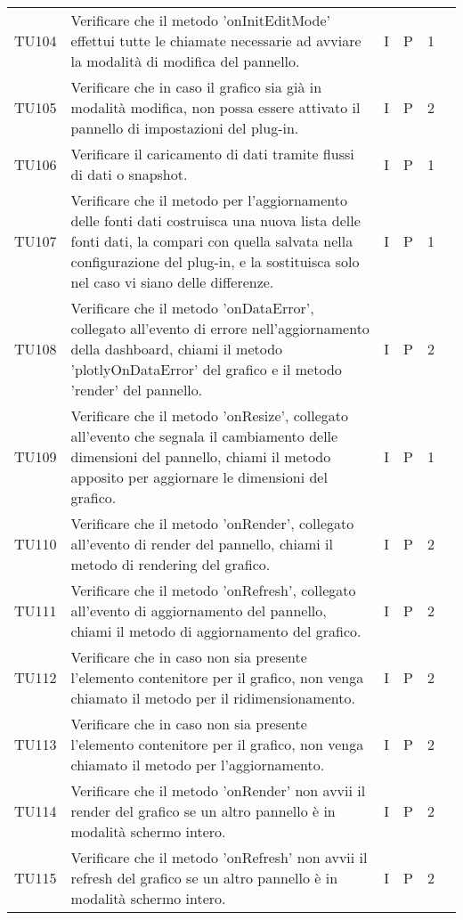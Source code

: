 \begin{longtable} {
		>{}p{12mm}
		>{}p{79.5mm}
		>{}p{9mm}
		>{}p{8mm}
		>{}p{14mm}
		>{}p{0mm}}
	TU104		& Verificare che il metodo 'onInitEditMode' effettui tutte le chiamate necessarie ad avviare la modalità di modifica del pannello. & I & P & 1 & \TBstrut \\ [2mm]
	TU105		& Verificare che in caso il grafico sia già in modalità modifica, non possa essere attivato il pannello di impostazioni del plug-in. & I & P & 2 & \TBstrut \\ [2mm]
	TU106		& Verificare il caricamento di dati tramite flussi di dati o snapshot. & I & P & 1 & \TBstrut \\ [2mm]
	TU107		& Verificare che il metodo per l'aggiornamento delle fonti dati costruisca una nuova lista delle fonti dati, la compari con quella salvata nella configurazione del plug-in, e la sostituisca solo nel caso vi siano delle differenze. & I & P & 1 & \TBstrut \\ [2mm]
	TU108		& Verificare che il metodo 'onDataError', collegato all'evento di errore nell'aggiornamento della dashboard, chiami il metodo 'plotlyOnDataError' del grafico e il metodo 'render' del pannello. & I & P & 2 & \TBstrut \\ [2mm]
	TU109		& Verificare che il metodo 'onResize', collegato all'evento che segnala il cambiamento delle dimensioni del pannello, chiami il metodo apposito per aggiornare le dimensioni del grafico. & I & P & 1 & \TBstrut \\ [2mm]
	TU110		& Verificare che il metodo 'onRender', collegato all'evento di render del pannello, chiami il metodo di rendering del grafico. & I & P & 2 & \TBstrut \\ [2mm]
	TU111		& Verificare che il metodo 'onRefresh', collegato all'evento di aggiornamento del pannello, chiami il metodo di aggiornamento del grafico. & I & P & 2 & \TBstrut \\ [2mm]
	TU112		& Verificare che in caso non sia presente l'elemento contenitore per il grafico, non venga chiamato il metodo per il ridimensionamento. & I & P & 2 & \TBstrut \\ [2mm]
	TU113		& Verificare che in caso non sia presente l'elemento contenitore per il grafico, non venga chiamato il metodo per l'aggiornamento. & I & P & 2 & \TBstrut \\ [2mm]
	TU114		& Verificare che il metodo 'onRender' non avvii il render del grafico se un altro pannello è in modalità schermo intero. & I & P & 2 & \TBstrut \\ [2mm]
	TU115		& Verificare che il metodo 'onRefresh' non avvii il refresh del grafico se un altro pannello è in modalità schermo intero. & I & P & 2 & \TBstrut \\ [2mm]

\end{longtable}
